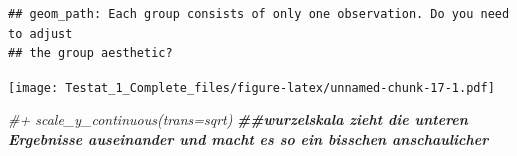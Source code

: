 \documentclass[
]{article}
\newenvironment{Shaded}{\begin{snugshade}}{\end{snugshade}}
\newcommand{\CommentTok}[1]{\textcolor[rgb]{0.56,0.35,0.01}{\textit{#1}}}
\newcommand{\DocumentationTok}[1]{\textcolor[rgb]{0.56,0.35,0.01}{\textbf{\textit{#1}}}}
\begin{document}
\begin{verbatim}
## geom_path: Each group consists of only one observation. Do you need to adjust
## the group aesthetic?
\end{verbatim}

\texttt{[image: Testat\_1\_Complete\_files/figure-latex/unnamed-chunk-17-1.pdf]}

\begin{Shaded}
\begin{Highlighting}[]
\CommentTok{\#+ scale\_y\_continuous(trans=\textquotesingle{}sqrt\textquotesingle{})}
\DocumentationTok{\#\#wurzelskala zieht die unteren Ergebnisse auseinander und macht es so ein bisschen anschaulicher}
\end{Highlighting}
\end{Shaded}
\end{document}
